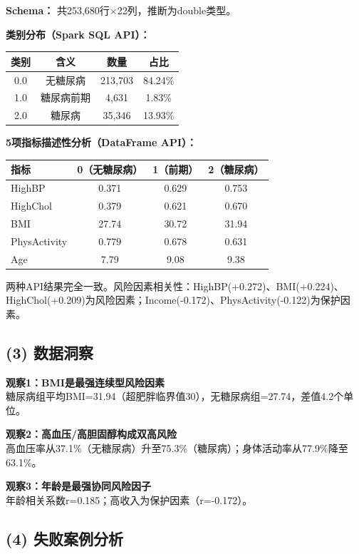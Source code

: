 \documentclass[12pt,a4paper]{article}
\begin{document}
\textbf{Schema：} 共253,680行$\times$22列，推断为double类型。

\textbf{类别分布（Spark SQL API）：}
\begin{table}[H]
\centering
\begin{tabular}{@{}cccc@{}}
\toprule
类别 & 含义 & 数量 & 占比 \\ \midrule
0.0 & 无糖尿病 & 213,703 & 84.24\% \\
1.0 & 糖尿病前期 & 4,631 & 1.83\% \\
2.0 & 糖尿病 & 35,346 & 13.93\% \\ \bottomrule
\end{tabular}
\end{table}

\textbf{5项指标描述性分析（DataFrame API）：}
\begin{table}[H]
\centering
\begin{tabular}{@{}lccc@{}}
\toprule
指标 & 0（无糖尿病） & 1（前期） & 2（糖尿病） \\ \midrule
HighBP & 0.371 & 0.629 & 0.753 \\
HighChol & 0.379 & 0.621 & 0.670 \\
BMI & 27.74 & 30.72 & 31.94 \\
PhysActivity & 0.779 & 0.678 & 0.631 \\
Age & 7.79 & 9.08 & 9.38 \\ \bottomrule
\end{tabular}
\end{table}

两种API结果完全一致。风险因素相关性：HighBP(+0.272)、BMI(+0.224)、HighChol(+0.209)为风险因素；Income(-0.172)、PhysActivity(-0.122)为保护因素。

\subsection{(3) 数据洞察}

\textbf{观察1：BMI是最强连续型风险因素} \\
糖尿病组平均BMI=31.94（超肥胖临界值30），无糖尿病组=27.74，差值4.2个单位。

\textbf{观察2：高血压/高胆固醇构成双高风险} \\
高血压率从37.1\%（无糖尿病）升至75.3\%（糖尿病）；身体活动率从77.9\%降至63.1\%。

\textbf{观察3：年龄是最强协同风险因子} \\
年龄相关系数r=0.185；高收入为保护因素（r=-0.172）。

\subsection{(4) 失败案例分析}
\end{document}
